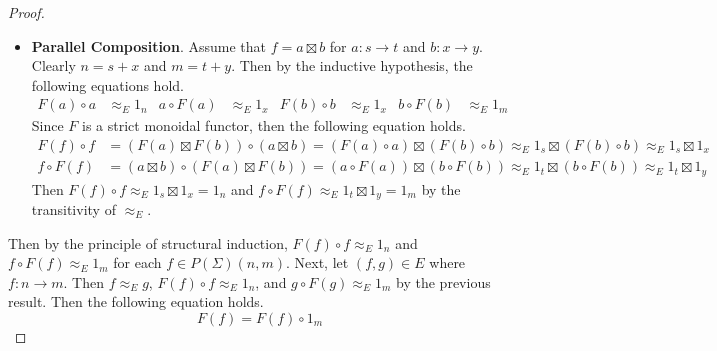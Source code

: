 \begin{proof}
\begin{itemize}
\begin{align*}
                \approx_E
                b \circ 1_x \circ F( b )
                =
                b \circ F( b )
                \approx_E
                1_m
          \end{align*}
          Then $F( f ) \circ f \approx_E 1_n$ and $f \circ F( f ) \approx_E 1_m$ by the transitivity of $\approx_E$.
    \item \textbf{Parallel Composition}.
          Assume that $f = a \boxtimes b$ for $a: s \to t$ and $b: x \to y$.
          Clearly $n = s + x$ and $m = t + y$.
          Then by the inductive hypothesis, the following equations hold.
          \begin{align*}
                F( a ) \circ a &\approx_E 1_n
                &
                a \circ F( a ) &\approx_E 1_x
                &
                F( b ) \circ b &\approx_E 1_x
                &
                b \circ F( b ) &\approx_E 1_m
          \end{align*}
          Since $F$ is a strict monoidal functor, then the following equation holds.
          \begin{align*}
              F( f ) \circ f
                &=
                ( F( a ) \boxtimes F( b ) ) \circ ( a \boxtimes b )
                =
                ( F( a ) \circ a ) \boxtimes ( F( b ) \circ b )
                \approx_E
                1_s \boxtimes ( F( b ) \circ b )
                \approx_E
                1_s \boxtimes 1_x
            \\
            f \circ F( f )
                &=
                ( a \boxtimes b ) \circ ( F( a ) \boxtimes F( b ) )
                =
                ( a \circ F( a ) ) \boxtimes ( b \circ F( b ) )
                \approx_E
                1_t \boxtimes ( b \circ F( b ) )
                \approx_E
                1_t \boxtimes 1_y
          \end{align*}
          Then $F( f ) \circ f \approx_E 1_s \boxtimes 1_x = 1_n$ and $f \circ F( f ) \approx_E 1_t \boxtimes 1_y = 1_m$ by the transitivity of $\approx_E$.
    \end{itemize}
    Then by the principle of structural induction, $F( f ) \circ f \approx_E 1_n$ and $f \circ F( f ) \approx_E 1_m$ for each $f \in P( \Sigma )( n, m )$.
    Next, let $( f, g ) \in E$ where $f: n \to m$.
    Then $f \approx_E g$, $F( f ) \circ f \approx_E 1_n$, and $g \circ F( g ) \approx_E 1_m$ by the previous result.
    Then the following equation holds.
    \begin{equation*}
        F( f )
        =
        F( f ) \circ 1_m

\end{equation*}
\end{proof}

